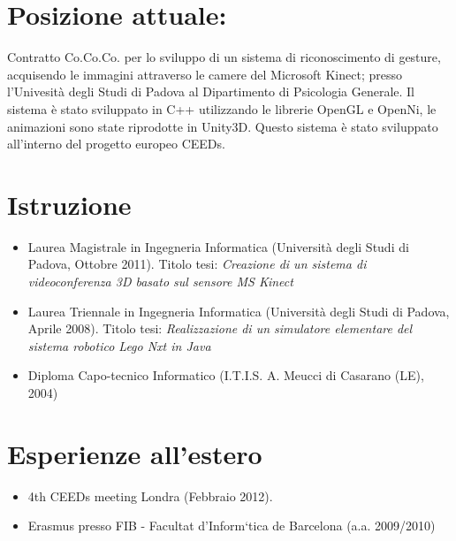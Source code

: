 \documentclass[pdftex,a4paper,12pt,twoside,titlepage,italian,openright]{article}
\begin{document}
\section*{Posizione attuale:}
	Contratto Co.Co.Co. per  lo sviluppo di un sistema di riconoscimento di gesture, acquisendo le immagini attraverso le camere
	del Microsoft Kinect; presso l'Univesità degli Studi di Padova al Dipartimento di Psicologia Generale. Il sistema è stato 
	sviluppato in C++ utilizzando le librerie OpenGL e OpenNi, le animazioni sono state riprodotte in Unity3D. Questo sistema è 
	stato sviluppato all'interno del progetto europeo CEEDs. 
\section*{Istruzione}
\begin{itemize}
	\item Laurea Magistrale in Ingegneria Informatica (Università degli Studi di Padova, Ottobre 2011).
	Titolo tesi: {\itshape Creazione di un sistema di videoconferenza 3D basato sul sensore MS Kinect}
	\item Laurea Triennale in Ingegneria Informatica (Università degli Studi di Padova, Aprile 2008). 
	Titolo tesi: {\itshape Realizzazione di un simulatore elementare del sistema robotico Lego Nxt
	in Java}
	\item Diploma Capo-tecnico Informatico (I.T.I.S. A. Meucci di Casarano (LE), 2004)
\end{itemize}
\section*{Esperienze all'estero}
\begin{itemize}
	\item 4th CEEDs meeting Londra (Febbraio 2012).
	\item Erasmus presso FIB - Facultat d’Inform`tica de Barcelona (a.a. 2009/2010)
\end{itemize}
\end{document}
